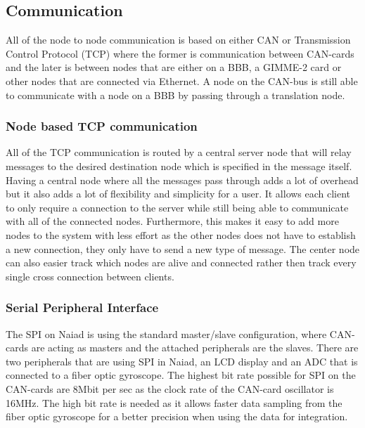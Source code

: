 \subsection{Communication} %

\noindent All of the node to node communication is based on either CAN or Transmission Control Protocol (TCP) where the former is communication between CAN-cards and the later is between nodes that are either on a BBB, a GIMME-2 card or other nodes that are connected via Ethernet. A node on the CAN-bus is still able to communicate with a node on a BBB by passing through a translation node.

\subsubsection{Node based TCP communication} %
\noindent All of the TCP communication is routed by a central server node that will relay messages to the desired destination node which is specified in the message itself. Having a central node where all the messages pass through adds a lot of overhead but it also adds a lot of flexibility and simplicity for a user. It allows each client to only require a connection to the server while still being able to communicate with all of the connected nodes. Furthermore, this makes it easy to add more nodes to the system with less effort as the other nodes does not have to establish a new connection, they only have to send a new type of message. The center node can also easier track which nodes are alive and connected rather then track every single cross connection between clients.

\subsubsection{Serial Peripheral Interface} %
\noindent The SPI on Naiad is using the standard master/slave configuration, where CAN-cards are acting as masters and the attached peripherals are the slaves. There are two peripherals that are using SPI in Naiad, an LCD display and an ADC that is connected to a fiber optic gyroscope\cite{fog}. The highest bit rate possible for SPI on the CAN-cards are 8Mbit per sec as the clock rate of the CAN-card oscillator is 16MHz. The high bit rate is needed as it allows faster data sampling from the fiber optic gyroscope for a better precision when using the data for integration.

